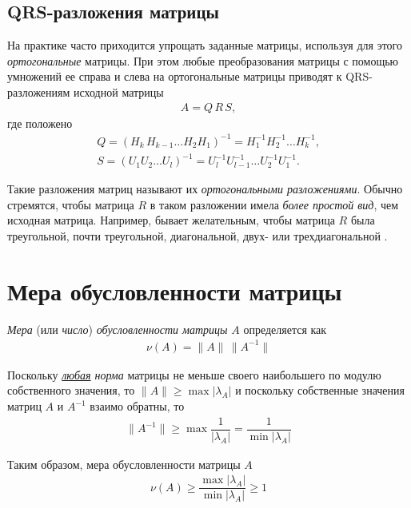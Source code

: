 \documentclass[%
	11pt,
	a4paper,
	utf8,
		]{article}
\begin{document}
\subsection{QRS-разложения матрицы}

На практике часто приходится упрощать заданные матрицы, используя для этого \emph{ортогональные} матрицы. При этом любые преобразования матрицы с помощью умножений ее справа и слева на ортогональные матрицы приводят к QRS-разложениям исходной матрицы
\begin{align*}
	A = Q \, R \, S,
\end{align*}
где положено
\begin{align*}
	Q = (H_k \, H_{k-1} \ldots H_2 H_1)^{-1} = H_1^{-1}H_2^{-1} \ldots H_k^{-1},\\
	S = (U_1U_2 \ldots U_l)^{-1} = U_l^{-1} U_{l-1}^{-1} \ldots U_2^{-1} U_1^{-1}.
\end{align*}

Такие разложения матриц называют их \emph{ортогональными разложениями}. Обычно стремятся, чтобы матрица $ R $ в таком разложении имела \emph{более простой вид}, чем исходная матрица. Например, бывает желательным, чтобы матрица $ R $ была треугольной, почти треугольной, диагональной, двух- или трехдиагональной \cite[]{shevtsov:linal-2012}.









\section{Мера обусловленности матрицы}

\emph{Мера} (или \emph{число}) \emph{обусловленности матрицы} $ A $ определяется как \cite[]{bahvalov:num_methods}
\begin{align*}
	\nu(A) = \| A \| \, \| A^{-1} \|
\end{align*}
 
Поскольку \emph{\underline{любая} норма} матрицы не меньше своего наибольшего по модулю собственного значения, то $ \| A \| \geqslant \max | \lambda_A | $ и поскольку собственные значения матриц $ A $ и $ A^{-1} $ взаимо обратны, то
\begin{align*}
	\| A^{-1} \| \geqslant \max \dfrac{1}{ | \lambda_A | } = \dfrac{1}{ \min | \lambda_A | }
\end{align*}

Таким образом, мера обусловленности матрицы $ A $
\begin{align*}
	\boxed{\nu(A) \geqslant \dfrac{\max | \lambda_A |}{ \min | \lambda_A | } \geqslant 1}
\end{align*}
\end{document}

